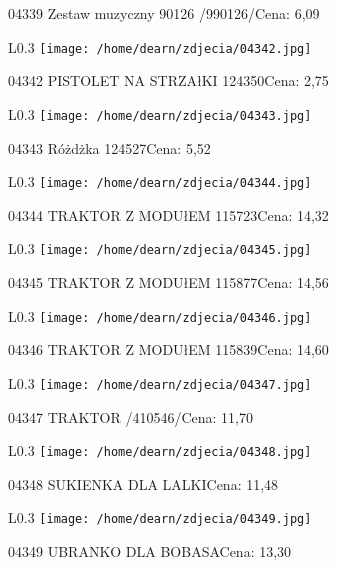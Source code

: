 04339 Zestaw muzyczny 90126 /990126/Cena: 6,09\newline
\begin{wrapfigure}{L}{0.3\textwidth}
\texttt{[image: /home/dearn/zdjecia/04342.jpg]}
\end{wrapfigure}
04342 PISTOLET NA STRZAłKI                            124350Cena: 2,75\newline
\begin{wrapfigure}{L}{0.3\textwidth}
\texttt{[image: /home/dearn/zdjecia/04343.jpg]}
\end{wrapfigure}
04343 Różdżka                               124527Cena: 5,52\newline
\begin{wrapfigure}{L}{0.3\textwidth}
\texttt{[image: /home/dearn/zdjecia/04344.jpg]}
\end{wrapfigure}
04344 TRAKTOR Z MODUłEM                               115723Cena: 14,32\newline
\begin{wrapfigure}{L}{0.3\textwidth}
\texttt{[image: /home/dearn/zdjecia/04345.jpg]}
\end{wrapfigure}
04345 TRAKTOR Z MODUłEM                               115877Cena: 14,56\newline
\begin{wrapfigure}{L}{0.3\textwidth}
\texttt{[image: /home/dearn/zdjecia/04346.jpg]}
\end{wrapfigure}
04346 TRAKTOR Z MODUłEM                               115839Cena: 14,60\newline
\begin{wrapfigure}{L}{0.3\textwidth}
\texttt{[image: /home/dearn/zdjecia/04347.jpg]}
\end{wrapfigure}
04347 TRAKTOR /410546/Cena: 11,70\newline
\begin{wrapfigure}{L}{0.3\textwidth}
\texttt{[image: /home/dearn/zdjecia/04348.jpg]}
\end{wrapfigure}
04348 SUKIENKA DLA LALKICena: 11,48\newline
\begin{wrapfigure}{L}{0.3\textwidth}
\texttt{[image: /home/dearn/zdjecia/04349.jpg]}
\end{wrapfigure}
04349 UBRANKO DLA BOBASACena: 13,30\newline
